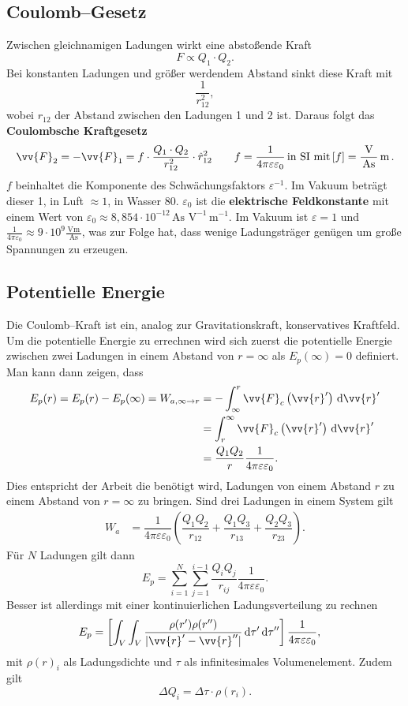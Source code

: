 \subsection{Coulomb--Gesetz}
Zwischen gleichnamigen Ladungen wirkt eine abstoßende Kraft
\[ 
        F\propto Q_1\cdot Q_2
.\]
Bei konstanten Ladungen und größer werdendem Abstand sinkt diese Kraft mit 
\[
        \dfrac{1}{r_{12}^2}
,\]
wobei $r_{12}$ der Abstand zwischen den Ladungen 1 und 2 ist. Daraus folgt das \textbf{Coulombsche Kraftgesetz} 
\[ 
        \vv{F}_2=-\vv{F}_1=f\cdot \dfrac{Q_1\cdot Q_2}{r_{12}^2}\cdot \hat{r}_{12}^2\qquad f=\dfrac{1}{4\pi \varepsilon \varepsilon _0}\,\text{in SI mit}\,[f]=\dfrac{\,\text{V}\,}{\,\text{As}\,}\,\text{m}\,
.\] 
$f$ beinhaltet die Komponente des Schwächungsfaktors $\varepsilon ^{-1}$. Im Vakuum beträgt dieser 1, in Luft $\approx 1$, in Wasser 80. $\varepsilon _0$ ist die \textbf{elektrische Feldkonstante} mit einem Wert von $\varepsilon _0\approx 8,854\cdot 10^{-12}\,\text{As}\,\,\text{V}^{-1}\,\text{m}^{-1}$. Im Vakuum ist $\varepsilon =1$ und $\tfrac{1}{4\pi \varepsilon _0}\approx 9\cdot 10^{9}\tfrac{\,\text{Vm}\,}{\,\text{As}\,}$, was zur Folge hat, dass wenige Ladungsträger genügen um große Spannungen zu erzeugen.

\subsection{Potentielle Energie}
Die Coulomb--Kraft ist ein, analog zur Gravitationskraft, konservatives Kraftfeld. Um die potentielle Energie zu errechnen wird sich zuerst die potentielle Energie zwischen zwei Ladungen in einem Abstand von $r=\infty$ als $E_p(\infty)=0$ definiert. Man kann dann zeigen, dass
\begin{align*}
        E_p(r)=E_p(r)-E_p(\infty)=W_{a,\infty\rightarrow r}&=-\int_{\infty}^{r}\vv{F}_c\left(\vv{r}'\right)\td \vv{r}'\\
                                                           &=\int_{r}^{\infty}\vv{F}_c\left(\vv{r}'\right)\td \vv{r}'\\
                                                           &=\dfrac{Q_1Q_2}{r}\dfrac{1}{4\pi \varepsilon \varepsilon _0}
.\end{align*}
Dies entspricht der Arbeit die benötigt wird, Ladungen von einem Abstand $r$ zu einem Abstand von $r=\infty$ zu bringen. Sind drei Ladungen in einem System gilt
\begin{align*}
        W_a&=\dfrac{1}{4\pi \varepsilon \varepsilon _0}\left(\dfrac{Q_1Q_2}{r_{12}}+\dfrac{Q_1Q_3}{r_{13}}+\dfrac{Q_2Q_3}{r_{23}}\right)
.\end{align*}
Für $N$ Ladungen gilt dann
\[ 
        E_p=\sum_{i=1}^{N}\sum_{j=1}^{i-1}\dfrac{Q_iQ_j}{r_{ij}}\dfrac{1}{4\pi \varepsilon \varepsilon _0}
.\] 
Besser ist allerdings mit einer kontinuierlichen Ladungsverteilung zu rechnen
\begin{align*}
        E_p&=\left[\int_{V}^{}\int_{V}^{}\dfrac{\rho (r')\rho (r'')}{|\vv{r}'-\vv{r}''|}\td \tau '\td \tau ''\right]\dfrac{1}{4\pi \varepsilon \varepsilon _0}
,\end{align*}
mit $\rho (r)_i$ als Ladungsdichte und $\tau $ als infinitesimales Volumenelement. Zudem gilt
\[ 
        \Delta Q_i=\Delta \tau \cdot \rho (r_i)
.\] 

